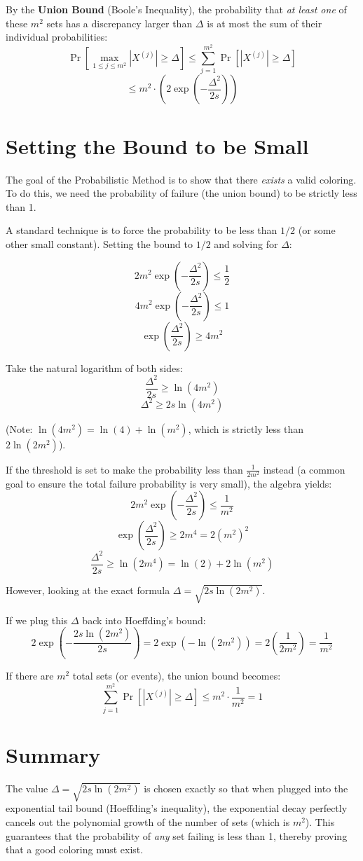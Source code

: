 \documentclass[11pt]{article}
\begin{document}
By the \textbf{Union Bound} (Boole's Inequality), the probability that \emph{at least one} of these \(m^2\) sets has a discrepancy larger than \(\Delta\) is at most the sum of their individual probabilities:
\[
 \Pr\left[\max_{1 \le j \le m^2} |X^{(j)}| \ge \Delta\right] \le \sum_{j=1}^{m^2} \Pr[|X^{(j)}| \ge \Delta] 
\]
\[
 \le m^2 \cdot \left( 2 \exp\left( -\frac{\Delta^2}{2s} \right) \right) 
\]

\section{Setting the Bound to be Small}
The goal of the Probabilistic Method is to show that there \emph{exists} a valid coloring. To do this, we need the probability of failure (the union bound) to be strictly less than 1. 

A standard technique is to force the probability to be less than \(1/2\) (or some other small constant). Setting the bound to \(1/2\) and solving for \(\Delta\):

\[
 2m^2 \exp\left( -\frac{\Delta^2}{2s} \right) \le \frac{1}{2} 
\]
\[
 4m^2 \exp\left( -\frac{\Delta^2}{2s} \right) \le 1 
\]
\[
 \exp\left( \frac{\Delta^2}{2s} \right) \ge 4m^2 
\]

Take the natural logarithm of both sides:
\[
 \frac{\Delta^2}{2s} \ge \ln(4m^2) 
\]
\[
 \Delta^2 \ge 2s \ln(4m^2) 
\]

(Note: \(\ln(4m^2) = \ln(4) + \ln(m^2)\), which is strictly less than \(2\ln(2m^2)\)).

If the threshold is set to make the probability less than \(\frac{1}{2m^2}\) instead (a common goal to ensure the total failure probability is very small), the algebra yields:
\[
 2m^2 \exp\left( -\frac{\Delta^2}{2s} \right) \le \frac{1}{m^2} 
\]
\[
 \exp\left( \frac{\Delta^2}{2s} \right) \ge 2m^4 = 2(m^2)^2 
\]
\[
 \frac{\Delta^2}{2s} \ge \ln(2m^4) = \ln(2) + 2\ln(m^2) 
\]

However, looking at the exact formula \(\Delta = \sqrt{2s \ln(2m^2)}\). 

If we plug this \(\Delta\) back into Hoeffding's bound:
\[
 2 \exp\left( -\frac{2s \ln(2m^2)}{2s} \right) = 2 \exp\left( -\ln(2m^2) \right) = 2 \left( \frac{1}{2m^2} \right) = \frac{1}{m^2} 
\]

If there are \(m^2\) total sets (or events), the union bound becomes:
\[
 \sum_{j=1}^{m^2} \Pr[|X^{(j)}| \ge \Delta] \le m^2 \cdot \frac{1}{m^2} = 1 
\]

\section{Summary}
The value \(\Delta = \sqrt{2s \ln(2m^2)}\) is chosen exactly so that when plugged into the exponential tail bound (Hoeffding's inequality), the exponential decay perfectly cancels out the polynomial growth of the number of sets (which is \(m^2\)). This guarantees that the probability of \emph{any} set failing is less than 1, thereby proving that a good coloring must exist.
\end{document}
